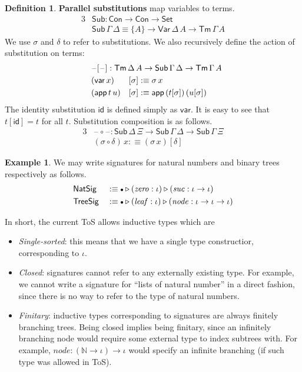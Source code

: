 \documentclass[12pt,a4paper,twoside,openany]{book}
\theoremstyle{remark}
\theoremstyle{definition}
\newtheorem{mydefinition}{Definition}
\newtheorem{myexample}{Example}
\theoremstyle{theorem}
\newcommand{\mi}[1]{\mathit{#1}}
\newcommand{\ms}[1]{\mathsf{#1}}
\newcommand{\id}{\mathsf{id}}
\newcommand{\Con}{\mathsf{Con}}
\newcommand{\Sub}{\mathsf{Sub}}
\newcommand{\Tm}{\mathsf{Tm}}
\newcommand{\blank}{\mathord{\hspace{1pt}\text{--}\hspace{1pt}}}
\newcommand{\Set}{\mathsf{Set}}
\newcommand{\ext}{\triangleright}
\newcommand{\emptycon}{\scaleobj{.75}\bullet}
\newcommand{\Var}{\ms{Var}}
\newcommand{\var}{\ms{var}}
\newcommand{\app}{\ms{app}}
\newcommand{\defn}{:\equiv}
\begin{document}
\begin{mydefinition} \textbf{Parallel substitutions} map variables to terms.
\begin{alignat*}{3}
&\Sub : \Con \to \Con \to \Set\\
&\Sub\,\Gamma\,\Delta \equiv \{A\} \to \Var\,\Delta\,A \to \Tm\,\Gamma\,A
\end{alignat*}
We use $\sigma$ and $\delta$ to refer to substitutions. We also recursively
define the action of substitution on terms:
\begin{alignat*}{3}
  &\rlap{$\blank[\blank] : \Tm\,\Delta\,A \to \Sub\,\Gamma\,\Delta \to \Tm\,\Gamma\,A$}\\
  &(\var\, x)   &&[ \sigma ] \defn \sigma\,x\\
  &(\app\,t\,u) &&[ \sigma ] \defn \app\,(t[\sigma])\,(u[\sigma])
\end{alignat*}
The identity substitution $\id$ is defined simply as $\var$. It is easy to see that
$t[\id] = t$ for all $t$. Substitution composition is as follows.
\begin{alignat*}{3}
  &\blank\!\circ\!\blank : \Sub\,\Delta\,\Xi \to \Sub\,\Gamma\,\Delta \to \Sub\,\Gamma\,\Xi\\
  &(\sigma \circ \delta)\,x \defn (\sigma\,x)[\delta]
\end{alignat*}
\end{mydefinition}

\begin{myexample} We may write signatures for natural numbers and binary trees respectively as follows.
\begin{alignat*}{3}
  & \ms{NatSig}  &&\defn \emptycon \ext (\mi{zero} : \iota) \ext (\mi{suc} : \iota \to \iota)\\
  & \ms{TreeSig} &&\defn \emptycon \ext (\mi{leaf} : \iota) \ext (\mi{node} : \iota \to \iota \to \iota)
\end{alignat*}
\end{myexample}

In short, the current ToS allows inductive types which are
\begin{itemize}
\item \emph{Single-sorted}: this means that we have a single type constructior, corresponding to $\iota$.
\item \emph{Closed}: signatures cannot refer to any externally existing type. For example, we cannot write a signature for ``lists of natural number'' in a direct fashion, since there is no way to refer to the type of natural numbers.
\item \emph{Finitary}: inductive types corresponding to signatures are always
  finitely branching trees. Being closed implies being finitary, since an
  infinitely branching node would require some external type to index subtrees
  with. For example, $\mi{node} : (\mathbb{N} \to \iota) \to \iota$ would
  specify an infinite branching (if such type was allowed in ToS).
\end{itemize}
\end{document}
